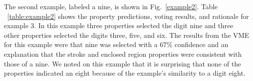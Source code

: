 \documentclass[conference]{IEEEtran}
\begin{document}

The second example,  labeled a nine, is shown in Fig.~\ref{example2}.  Table ~\ref{table:example2} shows the property predictions, voting results, and rationale for example 3.  In this example three properties selected the digit nine and three other properties selected the digits three, five, and six.  The results from the VME for this example were that nine was selected with a $67\%$ confidence and an explanation that the stroke and enclosed region properties were consistent with those of a nine.  We noted on this example that it is surprising that none of the properties indicated an eight because of the example's similarity to a digit eight.  
\end{document}
